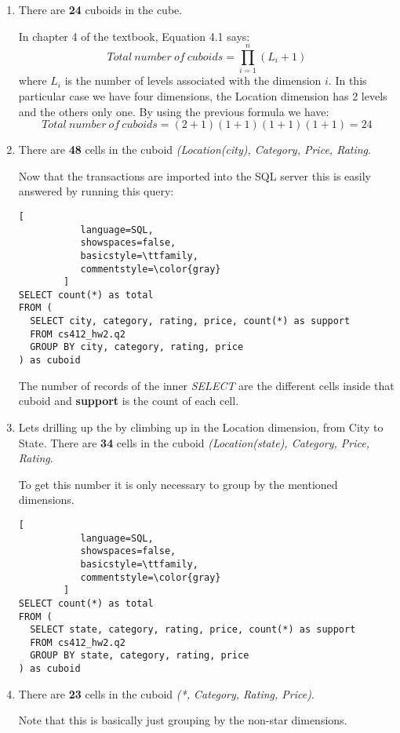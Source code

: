 \documentclass[11pt]{article}
\begin{document}
\begin{enumerate}[label=\alph*.]
\item There are \textbf{24} cuboids in the cube.

In chapter 4 of the textbook, Equation 4.1 says:
\[ Total\ number\ of\ cuboids = \prod_{i = 1}^n (L_i + 1) \]
where $L_i$ is the number of levels associated with the dimension $i$.
In this particular case we have four dimensions, the Location dimension has 2 levels and the others only one. By using the previous formula we have:
\[ Total\ number\ of\ cuboids = (2 + 1)(1 + 1)(1 + 1)(1 + 1) = 24\]

\item There are \textbf{48} cells in the cuboid \textit{(Location(city), Category, Price, Rating}.

Now that the transactions are imported into the SQL server this is easily answered by running this query:
\begin{lstlisting}[
           language=SQL,
           showspaces=false,
           basicstyle=\ttfamily,
           commentstyle=\color{gray}
        ]
SELECT count(*) as total
FROM (
  SELECT city, category, rating, price, count(*) as support
  FROM cs412_hw2.q2
  GROUP BY city, category, rating, price
) as cuboid
\end{lstlisting}
The number of records of the inner \textit{SELECT} are the different cells inside that cuboid and \textbf{support} is the count of each cell.

\item Lets drilling up the by climbing up in the Location dimension, from City to State. There are \textbf{34} cells in the cuboid \textit{(Location(state), Category, Price, Rating}.

To get this number it is only necessary to group by the mentioned dimensions. 

\begin{lstlisting}[
           language=SQL,
           showspaces=false,
           basicstyle=\ttfamily,
           commentstyle=\color{gray}
        ]
SELECT count(*) as total
FROM (
  SELECT state, category, rating, price, count(*) as support
  FROM cs412_hw2.q2
  GROUP BY state, category, rating, price
) as cuboid
\end{lstlisting}

\item There are \textbf{23} cells in the cuboid \textit{(*, Category, Rating, Price)}.

Note that this is basically just grouping by the non-star dimensions.


\end{enumerate}
\end{document}
